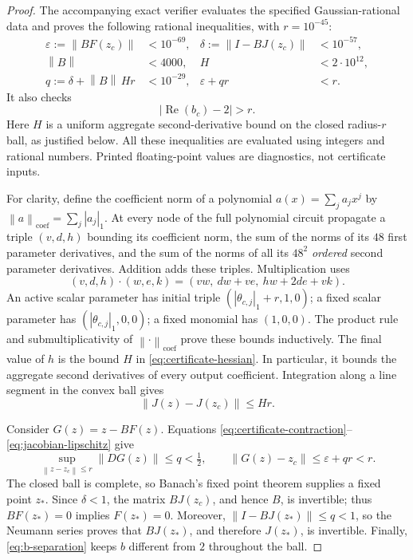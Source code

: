 \documentclass[11pt]{article}
\newcommand{\norm}[1]{\left\lVert #1\right\rVert}
\begin{document}
\begin{proof}
The accompanying exact verifier evaluates the specified Gaussian-rational
data and proves the following rational inequalities, with
$r=10^{-45}$:
\begin{align}
 \varepsilon:=\norm{BF(z_c)}&<10^{-69},&
 \delta:=\norm{I-BJ(z_c)}&<10^{-57},\label{eq:certificate-residual}\\
 \norm B&<4000,& H&<2\cdot10^{12},\label{eq:certificate-hessian}\\
 q:=\delta+\norm B\,Hr&<10^{-29},&
 \varepsilon+qr&<r.\label{eq:certificate-contraction}
\end{align}
It also checks
\begin{equation}\label{eq:b-separation}
 |\operatorname{Re}(b_c)-2|>r.
\end{equation}
Here $H$ is a uniform aggregate second-derivative bound on the closed
radius-$r$ ball, as justified below. All these inequalities are evaluated
using integers and rational numbers. Printed floating-point values are
diagnostics, not certificate inputs.

For clarity, define the coefficient norm of a polynomial
$a(x)=\sum_j a_jx^j$ by $\norm a_{\mathrm{coef}}=\sum_j|a_j|_1$.
At every node of the full polynomial circuit propagate a triple
$(v,d,h)$ bounding its coefficient norm, the sum of the norms of its
$48$ first parameter derivatives, and the sum of the norms of all its
$48^2$ \emph{ordered} second parameter derivatives. Addition adds these
triples. Multiplication uses
\begin{equation}\label{eq:majorant-product}
 (v,d,h)\cdot(w,e,k)
       =(vw,\ dw+ve,\ hw+2de+vk).
\end{equation}
An active scalar parameter has initial triple
$(|\theta_{c,j}|_1+r,1,0)$; a fixed scalar parameter has
$(|\theta_{c,j}|_1,0,0)$; a fixed monomial has $(1,0,0)$.
The product rule and submultiplicativity of
$\norm{\cdot}_{\mathrm{coef}}$ prove these bounds inductively.
The final value of $h$ is the bound $H$ in
\eqref{eq:certificate-hessian}. In particular, it bounds the aggregate
second derivatives of every output coefficient. Integration along a
line segment in the convex ball gives
\begin{equation}\label{eq:jacobian-lipschitz}
 \norm{J(z)-J(z_c)}\le Hr.
\end{equation}

Consider $G(z)=z-BF(z)$. Equations
\eqref{eq:certificate-contraction}--\eqref{eq:jacobian-lipschitz} give
\[
 \sup_{\norm{z-z_c}\le r}\norm{DG(z)}\le q<\tfrac12,
 \qquad
 \norm{G(z)-z_c}\le\varepsilon+qr<r.
\]
The closed ball is complete, so Banach's fixed point theorem supplies
a fixed point $z_*$. Since $\delta<1$, the matrix $BJ(z_c)$, and hence
$B$, is invertible; thus $BF(z_*)=0$ implies $F(z_*)=0$. Moreover,
$\norm{I-BJ(z_*)}\le q<1$, so the Neumann series proves that
$BJ(z_*)$, and therefore $J(z_*)$, is invertible. Finally,
\eqref{eq:b-separation} keeps $b$ different from $2$ throughout the ball.
\end{proof}
\end{document}
